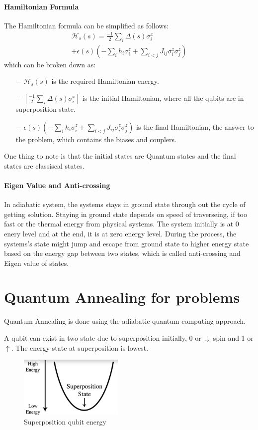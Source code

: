 \documentclass[12pt,conference]{IEEEtran}
\begin{document}
\paragraph{Hamiltonian Formula} 
The Hamiltonian formula can be simplified as follows:
\begin{multline*}
  \mathcal{H}_s(s) = \frac{-1}{2} \sum_i \Delta (s) \sigma_i^x  \\ + \epsilon(s) ( - \sum_i h_i \sigma_i^z + \sum_{i<j} J_{ij}  \sigma_i^z \sigma_j^z)
\end{multline*}
which can be broken down as:
\begin{itemize}
  \item[$-$] $\mathcal{H}_s(s)$ is the required Hamiltonian energy.
  \item[$-$] $[\frac{-1}{2} \sum_i \Delta (s) \sigma_i^x]$ is the initial Hamiltonian, where all the qubits are in superposition state.
  \item[$-$] $ \epsilon(s) ( - \sum_i h_i \sigma_i^z + \sum_{i<j} J_{ij}  \sigma_i^z \sigma_j^z)$ is the final Hamiltonian, the answer to the problem, which contains the biases and couplers.
\end{itemize} 
One thing to note is that the initial states are Quantum states and the final states are classiscal states.

\paragraph{Eigen Value and Anti-crossing}
In adiabatic system, the systems stays in ground state through out the cycle of getting solution. Staying in ground state depends on speed of traverseing, if too fast or the thermal energy from physical systems. The system initially is at 0 enery level and at the end, it is at zero energy level. During the process, the systems's state might jump and escape from ground state to higher energy state based on the energy gap between two states, which is called anti-crossing and Eigen value of states.

\section{Quantum Annealing for problems}
Quantum Annealing is done using the adiabatic quantum computing approach.

A qubit can exist in two state due to superposition initially, 0 or $\downarrow$  spin and 1 or $\uparrow$. The energy state at superposition is lowest. 
\begin{figure}[h]
  \centering
  \includegraphics[width=5cm]{sp-energy.png}
  \caption{Superposition qubit energy}
  \label{fig:SPQbitE}
\end{figure}
\end{document}
